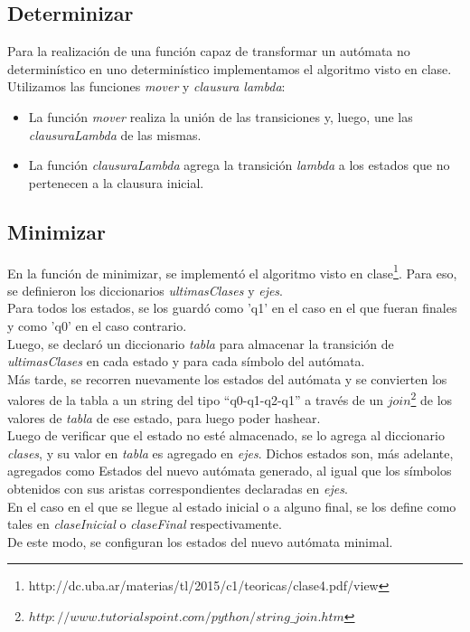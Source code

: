 \documentclass[a4paper, 10pt, twoside]{article}
\begin{document}
\subsection{Determinizar}
Para la realización de una función capaz de transformar un autómata no determinístico en uno determinístico implementamos el algoritmo visto en clase. Utilizamos las funciones \textit{mover} y \textit{clausura lambda}:
\begin{itemize}
\item La función \textit{mover} realiza la unión de las transiciones y, luego, une las \textit{clausuraLambda} de las mismas.
\item La función \textit{clausuraLambda} agrega la transición \textit{lambda} a los estados que no pertenecen a la clausura inicial.
\end{itemize}

\subsection{Minimizar}
En la función de minimizar, se implementó el algoritmo visto en clase\footnote{http://dc.uba.ar/materias/tl/2015/c1/teoricas/clase4.pdf/view}. Para eso, se definieron los diccionarios \textit{ultimasClases} y \textit{ejes}.\\
Para todos los estados, se los guardó como 'q1' en el caso en el que fueran finales y como 'q0' en el caso contrario.\\
Luego, se declaró un diccionario \textit{tabla} para almacenar la transición de \textit{ultimasClases} en cada estado y para cada símbolo del autómata.\\
Más tarde, se recorren nuevamente los estados del autómata y se convierten los valores de la tabla a un string del tipo ``q0-q1-q2-q1'' a través de un $join$\footnote{$http://www.tutorialspoint.com/python/string\_join.htm$} de los valores de \textit{tabla} de ese estado, para luego poder hashear.\\
Luego de verificar que el estado no esté almacenado, se lo agrega al diccionario \textit{clases}, y su valor en \textit{tabla} es agregado en \textit{ejes}. Dichos estados son, más adelante, agregados como Estados del nuevo autómata generado, al igual que los símbolos obtenidos con sus aristas correspondientes declaradas en \textit{ejes}.\\
En el caso en el que se llegue al estado inicial o a alguno final, se los define como tales en \textit{claseInicial} o \textit{claseFinal} respectivamente.\\
De este modo, se configuran los estados del nuevo autómata minimal.
\end{document}
